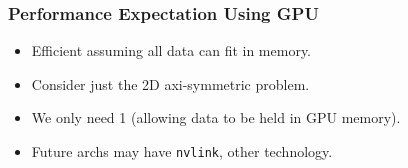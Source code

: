 \begin{frame}[label=perfExp]
\frametitle{Performance Expectation Using GPU} 
\begin{itemize} 
\small \item \small Efficient assuming all data can fit in memory. 
\item \small Consider just the 2D axi-symmetric problem. 
\item \small We only need 1 (allowing data to be held in GPU memory). 
\item \small Future archs may have \texttt{nvlink}, other technology.  
\end{itemize} 
\end{frame} 

